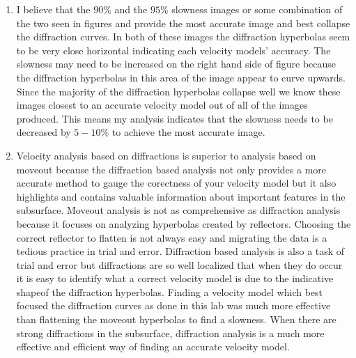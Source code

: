 \begin{enumerate}
  \item I believe that the $90\%$ and the $95\%$ slowness images or some combination of the two seen in figures  and  provide the most accurate image and best collapse the diffraction curves. In both of these images the diffraction hyperbolas seem to be very close horizontal indicating each velocity models' accuracy. The slowness may need to be increased on the right hand side of figure  because the diffraction hyperbolas in this area of the image appear to curve upwards. Since the majority of the diffraction hyperbolas collapse well we know these images closest to an accurate velocity model out of all of the images produced. This means my analysis indicates that the slowness needs to be decreased by $5-10\%$ to achieve the most accurate image.

  \item Velocity analysis based on diffractions is superior to analysis based on moveout because the diffraction based analysis not only provides a more accurate method to gauge the corectness of your velocity model but it also highlights and contains valuable information about important features in the subsurface. Moveout analysis is not as comprehensive as diffraction analysis because it focuses on analyzing hyperbolas created by reflectors. Choosing the correct reflector to flatten is not always easy and migrating the data is a tedious practice in trial and error. Diffraction based analysis is also a task of trial and error but diffractions are so well localized that when they do occur it is easy to identify what a correct velocity model is due to the indicative shapeof the diffraction hyperbolas. Finding a velocity model which best focused the diffraction curves as done in this lab was much more effective than flattening the moveout hyperbolas to find a slowness. When there are strong diffractions in the subsurface, diffraction analysis is a much more effective and efficient way of finding an accurate velocity model.  

\end{enumerate}


